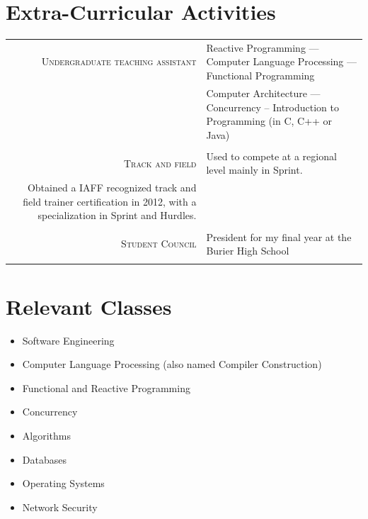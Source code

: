 \documentclass[a4paper,11pt]{article} %
\begin{document}

\section{Extra-Curricular Activities}
\begin{tabular}{rl}
\textsc{\large{Undergraduate teaching assistant}} &
Reactive Programming ---
Computer Language Processing --- Functional Programming \\
& Computer Architecture --- Concurrency -- Introduction to Programming (in C, C++ or Java) \\
\multicolumn{2}{c}{} \\

\textsc{\large{Track and field}} &
Used to compete at a regional level mainly in Sprint.\\
Obtained a IAFF recognized track and field trainer certification in 2012, with a specialization in Sprint and Hurdles.\\
\multicolumn{2}{c}{} \\

\textsc{\large{Student Council}} &
President for my final year at the Burier High School \\
\multicolumn{2}{c}{} \\

\end{tabular}



\section{Relevant Classes}
\begin{center}
\begin{itemize}
\item Software Engineering
\item Computer Language Processing (also named Compiler Construction)
\item Functional and Reactive Programming
\item Concurrency
\item Algorithms
\item Databases
\item Operating Systems
\item Network Security
\end{itemize}
\end{center}
\end{document}
